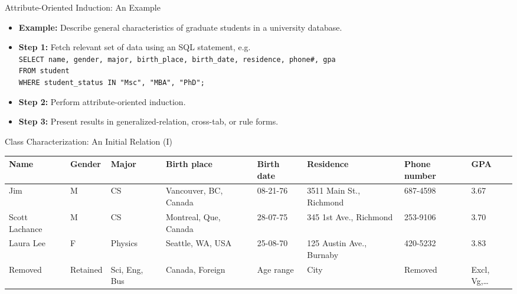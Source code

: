 \begin{frame}{Attribute-Oriented Induction: An Example}
	\begin{itemize}
		\item \textbf{Example:} Describe general characteristics of graduate students in a university database.
		\item \textbf{Step 1:} Fetch relevant set of data using an SQL statement, e.g.\\[0.1cm]
		      \texttt{SELECT name, gender, major, birth\_place, birth\_date, residence, phone\#, gpa}\\
		      \texttt{FROM student}\\
		      \texttt{WHERE student\_status IN {"Msc", "MBA", "PhD"};}\\[0.1cm]
		\item \textbf{Step 2:} Perform attribute-oriented induction.
		\item \textbf{Step 3:} Present results in generalized-relation, cross-tab, or rule forms.
	\end{itemize}
\end{frame}

\begin{frame}{Class Characterization: An Initial Relation (I)}
	\begin{table}
		\small
		\begin{tabularx}{\textwidth}{|X|X|X|X|X|X|X|X|}
			\hline
			\textbf{Name}        & \textbf{Gender}       & \textbf{Major}             & \textbf{Birth place}         & \textbf{Birth date}    & \textbf{Residence}       & \textbf{Phone number} & \textbf{GPA}                 \\\hline
			Jim                  & M                     & CS                         & Vancouver, BC, Canada        & 08-21-76               & 3511 Main St., Richmond  & 687-4598              & 3.67                         \\\hline
			Scott Lachance       & M                     & CS                         & Montreal, Que, Canada        & 28-07-75               & 345 1st Ave., Richmond   & 253-9106              & 3.70                         \\\hline
			Laura Lee            & F                     & Physics                    & Seattle, WA, USA             & 25-08-70               & 125 Austin Ave., Burnaby & 420-5232              & 3.83                         \\\hline
			{\color{red}Removed} & {\color{red}Retained} & {\color{red}Sci, Eng, Bus} & {\color{red}Canada, Foreign} & {\color{red}Age range} & {\color{red}City}        & {\color{red}Removed}  & {\color{red}Excl, Vg,\ldots} \\\hline
		\end{tabularx}
	\end{table}
\end{frame}

